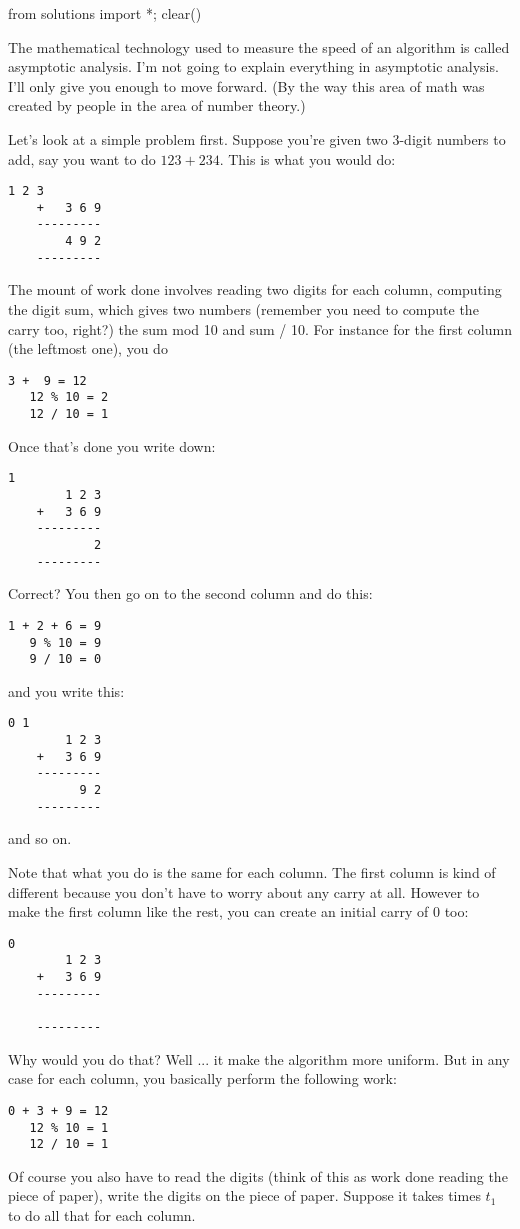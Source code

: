 \begin{python0}
from solutions import *; clear()
\end{python0}

The mathematical technology used to measure the speed of an algorithm is
called asymptotic analysis.
I'm not going to explain everything in asymptotic analysis.
I'll only give you enough to move forward.
(By the way this area of math was created by people in the area of
number theory.)

Let's look at a simple problem first.
Suppose you're given two 3-digit numbers to add, say you want to do
$123 + 234$.
This is what you would do:
\begin{Verbatim}[frame=single]
        1 2 3
    +   3 6 9
    ---------
        4 9 2 
    ---------
\end{Verbatim}
The mount of work done involves reading two digits for each column,
computing the digit sum, which gives two numbers (remember you need to
compute the carry too, right?) the sum mod 10 and sum / 10.
For instance for the first column (the leftmost one), you do
\begin{Verbatim}[frame=single]
    3 +  9 = 12
   12 % 10 = 2
   12 / 10 = 1
\end{Verbatim}
Once that's done you write down:
\begin{Verbatim}[frame=single]
          1
        1 2 3
    +   3 6 9
    ---------
            2 
    ---------
\end{Verbatim}
Correct? You then go on to the second column and do this:
\begin{Verbatim}[frame=single]
   1 + 2 + 6 = 9
   9 % 10 = 9
   9 / 10 = 0
\end{Verbatim}
and you write this:
\begin{Verbatim}[frame=single]
        0 1
        1 2 3
    +   3 6 9
    ---------
          9 2 
    ---------
\end{Verbatim}
and so on.

Note that what you do is the same for each column.
The first column is kind of different because you don't have 
to worry about any carry at all.
However to make the first column like the rest, you can create an
initial carry of 0 too:
\begin{Verbatim}[frame=single]
            0
        1 2 3
    +   3 6 9
    ---------
       
    ---------
\end{Verbatim}
Why would you do that?
Well ... it make the algorithm more uniform.
But in any case for each column, you basically perform the following
work:
\begin{Verbatim}[frame=single]
   0 + 3 + 9 = 12
   12 % 10 = 1
   12 / 10 = 1
\end{Verbatim}
Of course you also have to read the digits
(think of this as work done reading the piece of paper), 
write the digits on the piece of paper.
Suppose it takes times $t_1$ to do all that for each column.

